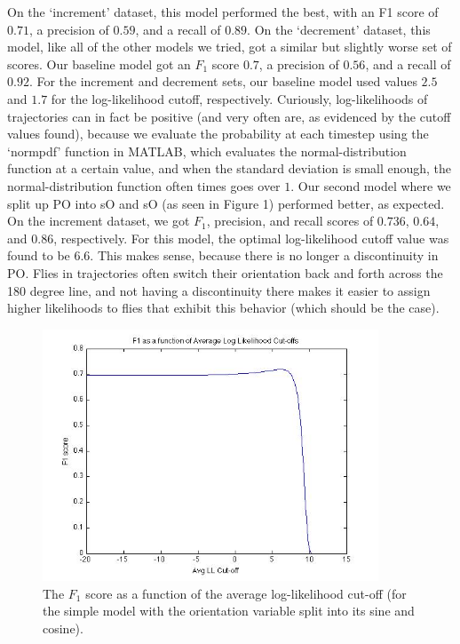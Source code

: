 \documentclass{article} %
\begin{document}
On the `increment' dataset, this model performed the best, with an F1 score of $0.71$, a precision of $0.59$, and a recall of $0.89$. On the `decrement' dataset, this model, like all of the other models we tried, got a similar but slightly worse set of scores. Our baseline model got an $F_1$ score $0.7$, a precision of $0.56$, and a recall of $0.92$. For the increment and decrement sets, our baseline model used values $2.5$ and $1.7$ for the log-likelihood cutoff, respectively. Curiously, log-likelihoods of trajectories can in fact be positive (and very often are, as evidenced by the cutoff values found), because we evaluate the probability at each timestep using the `normpdf’ function in MATLAB, which evaluates the normal-distribution function at a certain value, and when the standard deviation is small enough, the normal-distribution function often times goes over $1$.
Our second model where we split up PO into sO and sO (as seen in Figure 1) performed better, as expected. On the increment dataset, we got $F_1$, precision, and recall scores of $0.736$, $0.64$, and $0.86$, respectively. For this model, the optimal log-likelihood cutoff value was found to be 6.6. This makes sense, because there is no longer a discontinuity in PO. Flies in trajectories often switch their orientation back and forth across the 180 degree line, and not having a discontinuity there makes it easier to assign higher likelihoods to flies that exhibit this behavior (which should be the case).
\begin{figure}[t]
  \begin{center}
	\includegraphics[width=10cm]{simple-sincos-llf1.jpg}
	\end{center}
	\caption{The $F_1$ score as a function of the average log-likelihood cut-off (for the simple model with the orientation variable split into its sine and cosine).}
\end{figure}
\end{document}
